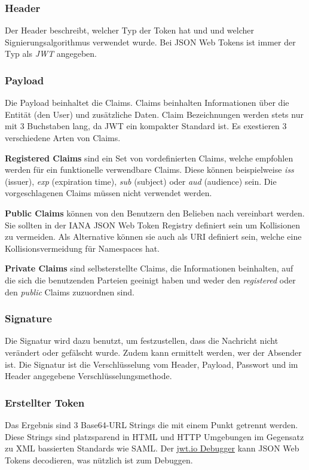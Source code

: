 \subsubsection{Header}
Der Header beschreibt, welcher Typ der Token hat und und welcher Signierungsalgorithmus verwendet wurde. 
Bei JSON Web Tokens ist immer der Typ als \textit{JWT} angegeben.

\subsubsection{Payload}
Die Payload beinhaltet die Claims. Claims beinhalten Informationen über die Entität (den User) und zusätzliche Daten. 
Claim Bezeichnungen werden stets nur mit 3 Buchstaben lang, da JWT ein kompakter Standard ist. Es exestieren 3 verschiedene Arten von Claims. 

\textbf{Registered Claims} sind ein Set von vordefinierten Claims, welche empfohlen werden für ein funktionelle verwendbare Claims. 
Diese können beispielweise \textit{iss} (issuer), \textit{exp} (expiration time), \textit{sub} (subject) oder \textit{aud} (audience) sein. 
Die vorgeschlagenen Claims müssen nicht verwendet werden. 

\textbf{Public Claims} können von den Benutzern den Belieben nach vereinbart werden. Sie sollten in der 
IANA JSON Web Token Registry definiert sein um Kollisionen zu vermeiden. Als Alternative können sie auch als URI definiert sein, welche eine Kollisionsvermeidung für Namespaces hat.

\textbf{Private Claims} sind selbsterstellte Claims, die Informationen beinhalten, auf die sich die benutzenden Parteien geeinigt haben und weder den \textit{registered} 
oder den \textit{public} Claims zuzuordnen sind.

\subsubsection{Signature}
Die Signatur wird dazu benutzt, um festzustellen, dass die Nachricht nicht verändert oder gefälscht wurde. Zudem kann ermittelt werden, wer der Absender ist. 
Die Signatur ist die Verschlüsselung vom Header, Payload, Passwort und im Header angegebene Verschlüsselungsmethode.

\subsubsection{Erstellter Token}
Das Ergebnis sind 3 Base64-URL Strings die mit einem Punkt getrennt werden. Diese Strings sind platzsparend in HTML und HTTP Umgebungen im Gegensatz zu XML bassierten Standards wie SAML. 
Der \href{https://jwt.io/#debugger-io}{jwt.io Debugger} kann JSON Web Tokens decodieren, was nützlich ist zum Debuggen.

